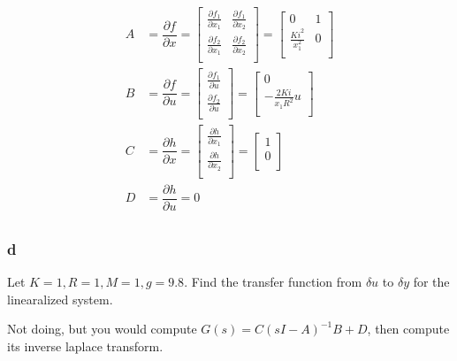 \documentclass[11pt]{article}
\begin{document}
\begin{align*}
    A &= \dfrac{\partial f}{\partial x} =
    \begin{bmatrix}
        \frac{\partial f_1}{\partial x_1} & \frac{\partial f_1}{\partial x_2} \\    
        \frac{\partial f_2}{\partial x_1} & \frac{\partial f_2}{\partial x_2} \\ 
    \end{bmatrix} = 
    \begin{bmatrix}
        0 & 1 \\
        \frac{Ki^2}{x_1^2} & 0 \\
    \end{bmatrix} \\
    B &= \dfrac{\partial f}{\partial u} =
    \begin{bmatrix}
        \frac{\partial f_1}{\partial u} \\
        \frac{\partial f_2}{\partial u} \\    
    \end{bmatrix} =
    \begin{bmatrix}
        0 \\
        -\frac{2Ki}{x_1 R^2} u \\    
    \end{bmatrix}\\
    C &= \dfrac{\partial h}{\partial x} = \begin{bmatrix}
        \frac{\partial h}{\partial x_1} \\
        \frac{\partial h}{\partial x_2} \\
    \end{bmatrix} =
    \begin{bmatrix}
        1 \\
        0 \\    
    \end{bmatrix}\\
    D &= \dfrac{\partial h}{\partial u} = 0\\
\end{align*}

\subsubsection{d}

Let $K = 1, R = 1, M = 1, g = 9.8$. Find the transfer function from $\delta u$ to $\delta y$ for the linearalized system.

Not doing, but you would compute $G(s) = C(sI - A)^{-1}B + D$, then compute its inverse laplace transform.
\end{document}
